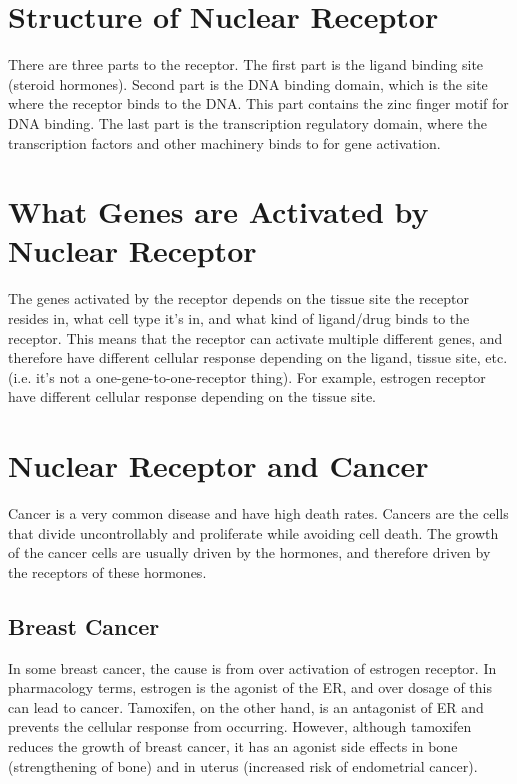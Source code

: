 \section{Structure of Nuclear Receptor}

There are three parts to the receptor.
The first part is the ligand binding site (steroid hormones).
Second part is the DNA binding domain, which is the site where the receptor binds to the DNA.
This part contains the zinc finger motif for DNA binding.
The last part is the transcription regulatory domain, where the transcription factors and other machinery binds to for gene activation.

\section{What Genes are Activated by Nuclear Receptor}

The genes activated by the receptor depends on the tissue site the receptor resides in, what cell type it's in, and what kind of ligand/drug binds to the receptor.
This means that the receptor can activate multiple different genes, and therefore have different cellular response depending on the ligand, tissue site, etc. (i.e. it's not a one-gene-to-one-receptor thing).
For example, estrogen receptor have different cellular response depending on the tissue site.

\section{Nuclear Receptor and Cancer}

Cancer is a very common disease and have high death rates.
Cancers are the cells that divide uncontrollably and proliferate while avoiding cell death.
The growth of the cancer cells are usually driven by the hormones, and therefore driven by the receptors of these hormones.

\subsection{Breast Cancer}

In some breast cancer, the cause is from over activation of estrogen receptor.
In pharmacology terms, estrogen is the agonist of the ER, and over dosage of this can lead to cancer.
Tamoxifen, on the other hand, is an antagonist of ER and prevents the cellular response from occurring.
However, although tamoxifen reduces the growth of breast cancer, it has an agonist side effects in bone (strengthening of bone) and in uterus (increased risk of endometrial cancer).


